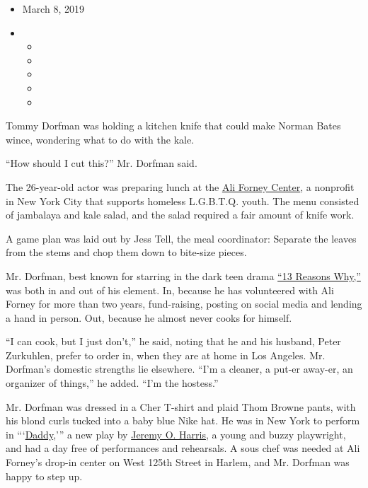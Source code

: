 \begin{itemize}
\item
  March 8, 2019
\item
  \begin{itemize}
  \item
  \item
  \item
  \item
  \item
  \end{itemize}
\end{itemize}

Tommy Dorfman was holding a kitchen knife that could make Norman Bates
wince, wondering what to do with the kale.

``How should I cut this?'' Mr. Dorfman said.

The 26-year-old actor was preparing lunch at the
\href{https://www.aliforneycenter.org/}{Ali Forney Center}, a nonprofit
in New York City that supports homeless L.G.B.T.Q. youth. The menu
consisted of jambalaya and kale salad, and the salad required a fair
amount of knife work.

A game plan was laid out by Jess Tell, the meal coordinator: Separate
the leaves from the stems and chop them down to bite-size pieces.

Mr. Dorfman, best known for starring in the dark teen drama
\href{https://www.nytimes.com/2017/03/30/arts/television/netflix-13-reasons-why-tv-review.html?action=click\&module=RelatedCoverage\&pgtype=Article\&region=Footer}{``13
Reasons Why,''} was both in and out of his element. In, because he has
volunteered with Ali Forney for more than two years, fund-raising,
posting on social media and lending a hand in person. Out, because he
almost never cooks for himself.

``I can cook, but I just don't,'' he said, noting that he and his
husband, Peter Zurkuhlen, prefer to order in, when they are at home in
Los Angeles. Mr. Dorfman's domestic strengths lie elsewhere. ``I'm a
cleaner, a put-er away-er, an organizer of things,'' he added. ``I'm the
hostess.''

Mr. Dorfman was dressed in a Cher T-shirt and plaid Thom Browne pants,
with his blond curls tucked into a baby blue Nike hat. He was in New
York to perform in
```\href{https://www.vineyardtheatre.org/daddy/}{Daddy},''' a new play
by
\href{https://www.nytimes.com/2016/08/18/style/jeremy-o-harris-actor-playwright-yale-james-franco.html}{Jeremy
O. Harris}, a young and buzzy playwright, and had a day free of
performances and rehearsals. A sous chef was needed at Ali Forney's
drop-in center on West 125th Street in Harlem, and Mr. Dorfman was happy
to step up.

